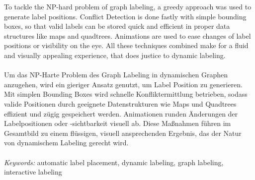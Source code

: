 To tackle the NP-hard problem of graph labeling, a greedy approach was used to generate label positions.
Conflict Detection is done fastly with simple bounding boxes, so that valid labels can be stored quick and efficient in proper data structures like maps and quadtrees.
Animations are used to ease changes of label positions or visibility on the eye.
All these techniques combined make for a fluid and visually appealing experience, that does justice to dynamic labeling.\\
\\
Um das NP-Harte Problem des Graph Labeling in dynamischen Graphen anzugehen, wird ein gieriger Ansatz genutzt, um Label Position zu generieren.
Mit simplen Bounding Boxes wird schnelle Konfliktermittlung betrieben, sodass valide Positionen durch geeignete Datenstrukturen wie Maps und Quadtrees effizient und zügig gespeichert werden.
Animationen runden Änderungen der Labelpositionen oder -sichtbarkeit visuell ab.
Diese Maßnahmen führen im Gesamtbild zu einem flüssigen, visuell ansprechenden Ergebnis, das der Natur von dynamischem Labeling gerecht wird.\\
\\
\textit{Keywords:} automatic label placement, dynamic labeling, graph labeling, interactive labeling
